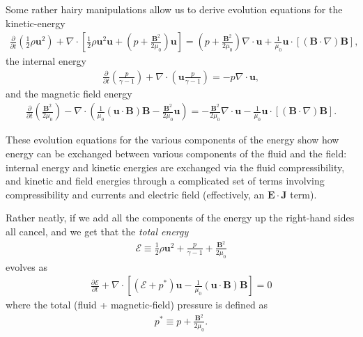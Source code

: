 \documentclass[12pt]{article}
\theoremstyle{definition}
\theoremstyle{definition}
\theoremstyle{definition}
\newcommand{\pfrac}[2]{\frac{\partial #1}{\partial #2}}
\newcommand{\mvec}[1]{\mathbf{#1}}
\begin{document}
Some rather hairy manipulations allow us to derive evolution equations
for the kinetic-energy
\begin{align}
  \frac{\partial}{\partial t}
  \left(
  \frac{1}{2}\rho\mvec{u}^2
  \right)
  +
  \nabla\cdot
  \left[
  \frac{1}{2}\rho\mvec{u}^2\mvec{u}
  +
  \left(p+\frac{\mvec{B}^2}{2\mu_0}\right)\mvec{u}
  \right]
  =
  \left(p+\frac{\mvec{B}^2}{2\mu_0}\right)\nabla\cdot\mvec{u}
  +
  \frac{1}{\mu_0}
  \mvec{u}\cdot
  \left[
  (\mvec{B}\cdot\nabla)\mvec{B}
  \right],
\end{align}
the internal energy 
\begin{align}
  \frac{\partial}{\partial t}\left(\frac{p}{\gamma-1}\right)
  +
  \nabla\cdot
  \left(\mvec{u}\frac{p}{\gamma-1}\right)
  =
  -p\nabla\cdot\mvec{u},
\end{align}
and the magnetic field energy
\begin{align}
  \frac{\partial}{\partial t}\left(\frac{\mvec{B}^2}{2\mu_0} \right)
  -\nabla\cdot
  \left(
  \frac{1}{\mu_0}(\mvec{u}\cdot\mvec{B})\mvec{B}
  -
  \frac{\mvec{B}^2}{2\mu_0}\mvec{u}
  \right)
  =
  -\frac{\mvec{B}^2}{2\mu_0}\nabla\cdot\mvec{u}
  -
  \frac{1}{\mu_0}\mvec{u}\cdot[(\mvec{B}\cdot\nabla)\mvec{B}].
\end{align}

These evolution equations for the various components of the energy
show how energy can be exchanged between various components of the
fluid and the field: internal energy and kinetic energies are
exchanged via the fluid compressibility, and kinetic and field
energies through a complicated set of terms involving compressibility
and currents and electric field (effectively, an
$\mvec{E}\cdot\mvec{J}$ term).

Rather neatly, if we add all the components of the energy up the
right-hand sides all cancel, and we get that the \emph{total energy}
\begin{align}
  \mathcal{E}
  \equiv
  \frac{1}{2}\rho\mvec{u}^2
  +
  \frac{p}{\gamma-1}
  +
  \frac{\mvec{B}^2}{2\mu_0}
\end{align}
evolves as
\begin{align}
  \pfrac{\mathcal{E}}{t}
  +
  \nabla\cdot
  \left[
  (\mathcal{E}+p^*)\mvec{u} - \frac{1}{\mu_0}(\mvec{u}\cdot\mvec{B})\mvec{B}
  \right]
  =
  0
\end{align}
where the total (fluid + magnetic-field) pressure is defined as
\begin{align}
  p^* \equiv p + \frac{\mvec{B}^2}{2\mu_0}.
\end{align}
\end{document}
